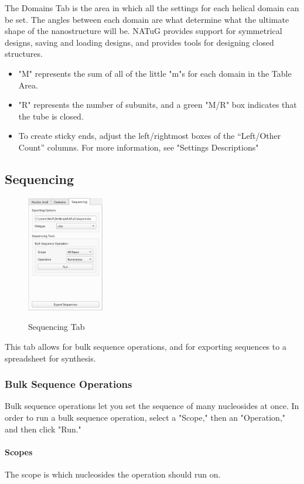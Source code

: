 \documentclass[titlepage]{article}
\begin{document}
	The Domains Tab is the area in which all the settings for each helical domain can be set. The angles between each domain are what determine what the ultimate shape of the nanostructure will be. NATuG provides support for symmetrical designs, saving and loading designs, and provides tools for designing closed structures.
	
	\begin{itemize}
		\item "M" represents the sum of all of the little "m"s for each domain in the Table Area.
		\item "R" represents the number of subunits, and a green "M/R" box indicates that the tube is closed.
		\item To create sticky ends, adjust the left/rightmost boxes of the “Left/Other Count” columns. For more information, see "Settings Descriptions"
	\end{itemize}
	
	\subsection{Sequencing}
	
	\begin{figure}
		\centering
		\caption{Sequencing Tab}
		\includegraphics[height=2in]{sequencing-tab.png}
		\label{fig:sequencing-tab}
	\end{figure}
	
	This tab allows for bulk sequence operations, and for exporting sequences to a spreadsheet for synthesis.
	
	\subsubsection{Bulk Sequence Operations}
	Bulk sequence operations let you set the sequence of many nucleosides at once. In order to run a bulk sequence operation, select a "Scope," then an "Operation," and then click "Run."
	
	\paragraph{Scopes}
	The scope is which nucleosides the operation should run on.
	
\end{document}
